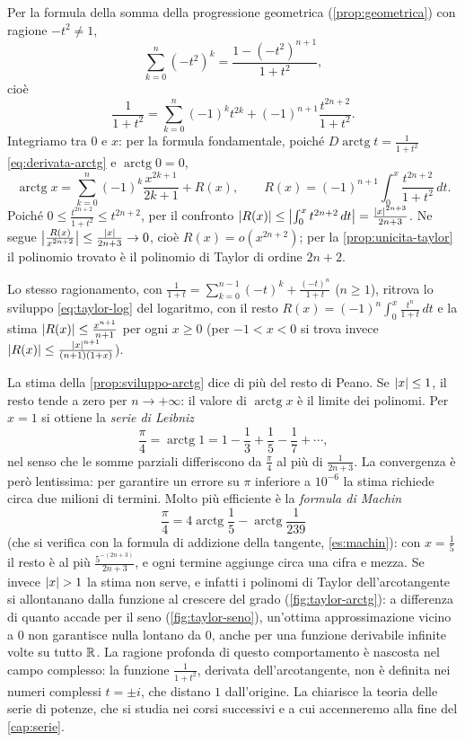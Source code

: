 \begin{dimostrazione}
Per la formula della somma della progressione geometrica (\cref{prop:geometrica}) con
ragione $-t^{2}\neq1$,
\[
  \sum_{k=0}^{n}(-t^{2})^{k}=\frac{1-(-t^{2})^{n+1}}{1+t^{2}} ,
\]
cioè
\[
  \frac1{1+t^{2}}=\sum_{k=0}^{n}(-1)^{k}t^{2k}+(-1)^{n+1}\frac{t^{2n+2}}{1+t^{2}} .
\]
Integriamo tra $0$ e $x$: per la formula fondamentale, poiché $D\operatorname{arctg}t=\frac1{1+t^{2}}$
\eqref{eq:derivata-arctg} e $\operatorname{arctg}0=0$,
\[
  \operatorname{arctg}x=\sum_{k=0}^{n}(-1)^{k}\frac{x^{2k+1}}{2k+1}+R(x), \qquad
  R(x)=(-1)^{n+1}\int_{0}^{x}\frac{t^{2n+2}}{1+t^{2}}\,dt .
\]
Poiché $0\le\frac{t^{2n+2}}{1+t^{2}}\le t^{2n+2}$, per il confronto
$\lvert R(x)\rvert\le\bigl|\int_{0}^{x}t^{2n+2}\,dt\bigr|=\frac{\lvert x\rvert^{2n+3}}{2n+3}$. Ne segue
$\bigl|\frac{R(x)}{x^{2n+2}}\bigr|\le\frac{\lvert x\rvert}{2n+3}\to0$, cioè $R(x)=o(x^{2n+2})$; per la
\cref{prop:unicita-taylor} il polinomio trovato è il polinomio di Taylor di ordine $2n+2$.
\end{dimostrazione}

Lo stesso ragionamento, con $\frac1{1+t}=\sum_{k=0}^{n-1}(-t)^{k}+\frac{(-t)^{n}}{1+t}$ ($n\ge1$), ritrova lo
sviluppo \eqref{eq:taylor-log} del logaritmo, con il resto
$R(x)=(-1)^{n}\int_{0}^{x}\frac{t^{n}}{1+t}\,dt$ e la stima $\lvert R(x)\rvert\le\frac{x^{n+1}}{n+1}$ per ogni $x\ge0$ (per
$-1<x<0$ si trova invece $\lvert R(x)\rvert\le\frac{\lvert x\rvert^{n+1}}{(n+1)(1+x)}$).

La stima della \cref{prop:sviluppo-arctg} dice di più del resto di Peano. Se $\lvert x\rvert\le1$,
il resto tende a zero per $n\to+\infty$: il valore di $\operatorname{arctg}x$ è il limite dei
polinomi. Per $x=1$ si ottiene la \emph{serie di Leibniz}
\begin{equation}\label{eq:serie-leibniz}
  \frac\pi4=\operatorname{arctg}1=1-\frac13+\frac15-\frac17+\cdots ,
\end{equation}
nel senso che le somme parziali differiscono da $\frac\pi4$ al più di $\frac1{2n+3}$. La
convergenza è però lentissima: per garantire un errore su $\pi$ inferiore a $10^{-6}$ la
stima richiede circa due milioni di termini. Molto più efficiente è la
\emph{formula di Machin}
\begin{equation}\label{eq:machin}
  \frac\pi4=4\operatorname{arctg}\frac15-\operatorname{arctg}\frac1{239}
\end{equation}
(che si verifica con la formula di addizione della tangente, \cref{es:machin}): con
$x=\frac15$ il resto è al più $\frac{5^{-(2n+3)}}{2n+3}$, e ogni termine aggiunge circa una cifra e
mezza. Se invece $\lvert x\rvert>1$ la stima non serve, e infatti i polinomi di Taylor
dell'arcotangente si allontanano dalla funzione al crescere del grado
(\cref{fig:taylor-arctg}): a differenza di quanto accade per il seno
(\cref{fig:taylor-seno}), un'ottima approssimazione vicino a $0$ non garantisce nulla
lontano da $0$, anche per una funzione derivabile infinite volte su tutto $\mathbb{R}$. La ragione profonda di questo
comportamento è nascosta nel campo complesso: la funzione $\frac1{1+t^{2}}$, derivata
dell'arcotangente, non è definita nei numeri complessi $t=\pm i$, che distano $1$
dall'origine. La chiarisce la teoria delle serie di potenze, che si studia nei corsi
successivi e a cui accenneremo alla fine del \cref{cap:serie}.

